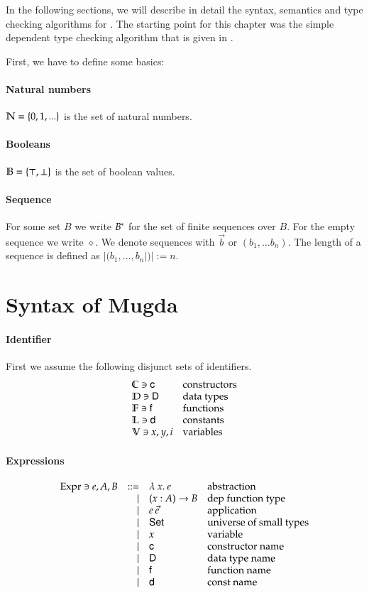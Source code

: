 In the following sections, we will describe in detail the syntax, semantics and type checking algorithms for \mugda.
The starting point for this chapter was the simple dependent type checking algorithm that is given in \cite{coquand96algorithm}.

\noindent First, we have to define some basics:
\paragraph*{Natural numbers}
$ \mathbb{N} = \{ 0 , 1 , ... \} $ is the set of natural numbers.
\paragraph*{Booleans}
$ \mathbb{B} = \{ \top, \bot \} $ is the set of boolean values.
\paragraph*{Sequence}
For some set $B$ we write ${B}^{\ast}$ for the set of finite sequences over $B$.
For the empty sequence we write $\diamond$.
We denote sequences with $\vec{b}$ or $(b_1, \ldots b_n)$.
The length of a sequence is defined as $|(b_1,\ldots, b_n|)| := n $. 
\section{Syntax of Mugda}

\paragraph*{Identifier}
First we assume the following disjunct sets of identifiers.
\[
\begin{array}{ll}
\mathbb{C} \ni \mathsf{c} & \mbox{constructors}\\
\mathbb{D} \ni \mathsf{D} & \mbox{data types}\\
\mathbb{F} \ni \mathsf{f} & \mbox{functions}\\
\mathbb{L} \ni \mathsf{d} & \mbox{constants}\\
\mathbb{V} \ni x,y,i & \mbox{variables}
\end{array}
\]

\paragraph*{Expressions}
\[
\begin{array}{lrll}
\mathrm{Expr} \ni e,A,B & ::= & \lambda\: x .\:{e} & \mbox{abstraction}\\
& \mid & ( x : A ) \rightarrow{B} & \mbox{dep function type}\\
& \mid & e \: \vec{e} & \mbox{application}\\
& \mid & \mathsf{Set} & \mbox{universe of small types}\\
& \mid & x & \mbox{variable}\\
& \mid & \mathsf{c} & \mbox{constructor name}\\
& \mid & \mathsf{D} & \mbox{data type name}\\
& \mid & \mathsf{f} & \mbox{function name}\\
& \mid & \mathsf{d} & \mbox{const name}
\end{array}
\]

